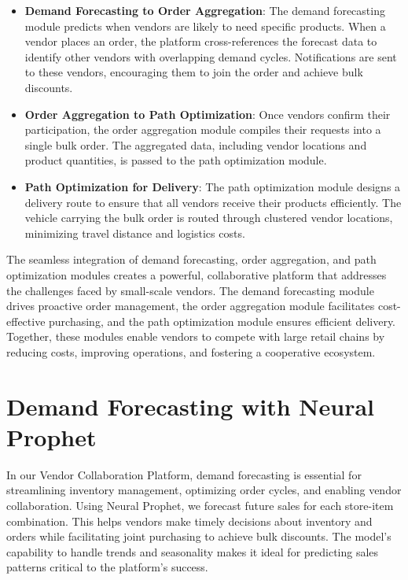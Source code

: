 \begin{itemize}
    \item \textbf{Demand Forecasting to Order Aggregation}: The demand forecasting module predicts when vendors are likely to need specific products. When a vendor places an order, the platform cross-references the forecast data to identify other vendors with overlapping demand cycles. Notifications are sent to these vendors, encouraging them to join the order and achieve bulk discounts.
    \item \textbf{Order Aggregation to Path Optimization}: Once vendors confirm their participation, the order aggregation module compiles their requests into a single bulk order. The aggregated data, including vendor locations and product quantities, is passed to the path optimization module.
    \item \textbf{Path Optimization for Delivery}: The path optimization module designs a delivery route to ensure that all vendors receive their products efficiently. The vehicle carrying the bulk order is routed through clustered vendor locations, minimizing travel distance and logistics costs.
\end{itemize}



The seamless integration of demand forecasting, order aggregation, and path optimization modules creates a powerful, collaborative platform that addresses the challenges faced by small-scale vendors. The demand forecasting module drives proactive order management, the order aggregation module facilitates cost-effective purchasing, and the path optimization module ensures efficient delivery. Together, these modules enable vendors to compete with large retail chains by reducing costs, improving operations, and fostering a cooperative ecosystem.




\section{Demand Forecasting with Neural Prophet}

In our Vendor Collaboration Platform, demand forecasting is essential for streamlining inventory management, optimizing order cycles, and enabling vendor collaboration. Using Neural Prophet, we forecast future sales for each store-item combination. This helps vendors make timely decisions about inventory and orders while facilitating joint purchasing to achieve bulk discounts. The model’s capability to handle trends and seasonality makes it ideal for predicting sales patterns critical to the platform’s success.

